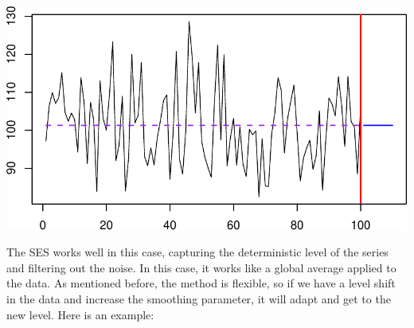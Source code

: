 \documentclass[
]{book}
\newenvironment{Shaded}{\begin{snugshade}}{\end{snugshade}}
\newcommand{\AttributeTok}[1]{\textcolor[rgb]{0.77,0.63,0.00}{#1}}
\newcommand{\DecValTok}[1]{\textcolor[rgb]{0.00,0.00,0.81}{#1}}
\newcommand{\FloatTok}[1]{\textcolor[rgb]{0.00,0.00,0.81}{#1}}
\newcommand{\FunctionTok}[1]{\textcolor[rgb]{0.00,0.00,0.00}{#1}}
\newcommand{\NormalTok}[1]{#1}
\newcommand{\OtherTok}[1]{\textcolor[rgb]{0.56,0.35,0.01}{#1}}
\newcommand{\SpecialCharTok}[1]{\textcolor[rgb]{0.00,0.00,0.00}{#1}}
\newcommand{\StringTok}[1]{\textcolor[rgb]{0.31,0.60,0.02}{#1}}
\theoremstyle{definition}
\theoremstyle{definition}
\theoremstyle{definition}
\theoremstyle{definition}
\theoremstyle{remark}
\begin{document}
\begin{Shaded}
\end{Shaded}

\includegraphics{adam_files/figure-latex/SESExample1-1.pdf}

The SES works well in this case, capturing the deterministic level of the series and filtering out the noise. In this case, it works like a global average applied to the data. As mentioned before, the method is flexible, so if we have a level shift in the data and increase the smoothing parameter, it will adapt and get to the new level. Here is an example:

\begin{Shaded}
\end{Shaded}
\end{document}
